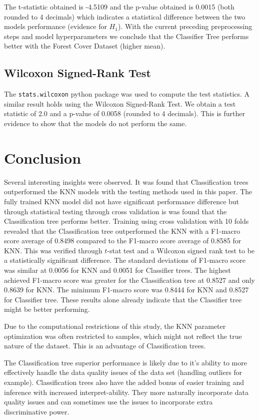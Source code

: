 \documentclass[conference]{IEEEtran}
\begin{document}
The t-statistic obtained is -4.5109 and the p-value obtained is 0.0015 (both rounded to 4 decimals) which indicates a statistical difference between the two models performance (evidence for $H_1$). With the current preceding preprocessing steps and model hyperparameters we conclude that the Classifier Tree performs better with the Forest Cover Dataset (higher mean).

\subsection{Wilcoxon Signed-Rank Test}

The \texttt{stats.wilcoxon} python package was used to compute the test statistics. A similar result holds using the Wilcoxon Signed-Rank Test. We obtain a test statistic of 2.0 and a p-value of 0.0058 (rounded to 4 decimals). This is further evidence to show that the models do not perform the same.


\section{Conclusion}

Several interesting insights were observed. It was found that Classification trees outperformed the KNN models with the testing methods used in this paper. The fully trained KNN model did not have significant performance difference but through statistical testing through cross validation is was found that the Classification tree performs better. Training using cross validation with 10 folds revealed that the Classification tree outperformed the KNN with a F1-macro score average of 0.8498 compared to the F1-macro score average of 0.8585 for KNN. This was verified through $t$-stat test and a Wilcoxon signed rank test to be a statistically significant difference. The standard deviations of F1-macro score was similar at 0.0056 for KNN and 0.0051 for Classifier trees. The highest achieved F1-macro score was greater for the Classification tree at 0.8527 and only 0.8639 for KNN. The minimum F1-macro score was 0.8444 for KNN and 0.8527 for Classifier tree. These results alone already indicate that the Classifier tree might be better performing.

Due to the computational restrictions of this study, the KNN parameter optimization was often restricted to samples, which might not reflect the true nature of the dataset. This is an advantage of Classification trees.

The Classification tree superior performance is likely due to it's ability to more effectively handle the data quality issues of the data set (handling outliers for example). Classification trees also have the added bonus of easier training and inference with increased interpret-ability. They more naturally incorporate data quality issues and can sometimes use the issues to incorporate extra discriminative power.
\end{document}
